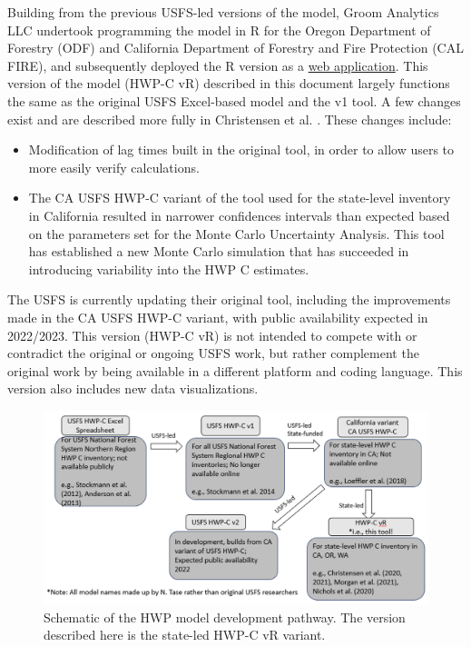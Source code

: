 \documentclass[
  openany]{book}
\providecommand{\tightlist}{%
  \setlength{\itemsep}{0pt}\setlength{\parskip}{0pt}}
\begin{document}
Building from the previous USFS-led versions of the model, Groom Analytics LLC undertook programming the model in R for the Oregon Department of Forestry (ODF) and California Department of Forestry and Fire Protection (CAL FIRE), and subsequently deployed the R version as a \href{https://groomanalyticsllc.shinyapps.io/HWP-C-vR/}{web application}. This version of the model (HWP-C vR) described in this document largely functions the same as the original USFS Excel-based model and the v1 tool. A few changes exist and are described more fully in Christensen et al. \autocite*{christensen2020,christensen2021}. These changes include:

\begin{itemize}
\tightlist
\item
  Modification of lag times built in the original tool, in order to allow users to more easily verify calculations.\\
\item
  The CA USFS HWP-C variant of the tool used for the state-level inventory in California resulted in narrower confidences intervals than expected based on the parameters set for the Monte Carlo Uncertainty Analysis. This tool has established a new Monte Carlo simulation that has succeeded in introducing variability into the HWP C estimates.
\end{itemize}

The USFS is currently updating their original tool, including the improvements made in the CA USFS HWP-C variant, with public availability expected in 2022/2023. This version (HWP-C vR) is not intended to compete with or contradict the original or ongoing USFS work, but rather complement the original work by being available in a different platform and coding language. This version also includes new data visualizations.

\begin{figure}
\includegraphics[width=1\linewidth]{images/ModelHistory} \caption{Schematic of the HWP model development pathway.  The version described here is the state-led HWP-C vR variant.}\label{fig:hist-fig}
\end{figure}
\end{document}
